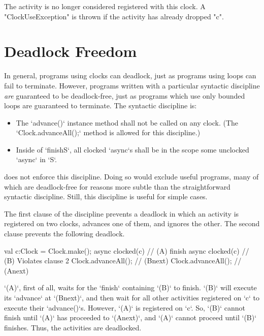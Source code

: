\noindent{} The activity is no longer considered registered with this
clock.  A \xcd"ClockUseException" is thrown if the activity has
already dropped \xcd"c".

\section{Deadlock Freedom}

In general, programs using clocks can deadlock, just as programs using loops
can fail to terminate.  However, programs written with a particular syntactic
discipline {\em are} guaranteed to be deadlock-free, just as programs which
use only bounded loops are guaranteed to terminate.  The syntactic discipline
is: 
\begin{itemize}
\item The \xcd`advance()` {instance method} shall not be called on any clock.
      (The 
      \xcd`Clock.advanceAll();` method is allowed for this discipline.)
\item Inside of \xcd`finish{S}`, all clocked \xcd`async`s shall be in the scope
      some unclocked \xcd`async` in \xcd`S`.
\end{itemize}
\Xten{} does not enforce this discipline.  Doing so would exclude useful programs,
many of which are deadlock-free for reasons more subtle than the
straightforward syntactic discipline.  Still, this discipline is useful for
simple cases. 

The first clause of the discipline prevents a deadlock in which an activity
is registered on two clocks, advances one of them, and ignores the other. 
The second clause prevents the following deadlock.  
\begin{xten}
val c:Clock = Clock.make();
async clocked(c) {                // (A) 
      finish async clocked(c) {   // (B) Violates clause 2
            Clock.advanceAll();   // (Bnext)
      }
      Clock.advanceAll();         // (Anext)
}
\end{xten}
\xcd`(A)`, first of all, waits for the \xcd`finish` containing \xcd`(B)` to
finish.  
\xcd`(B)` will execute its \xcd`advance` at \xcd`(Bnext)`, and then wait for all
other activities registered on \xcd`c` to execute their \xcd`advance()`s.
However, \xcd`(A)` is registered on \xcd`c`.  So, \xcd`(B)` cannot finish
until \xcd`(A)` has proceeded to \xcd`(Anext)`, and \xcd`(A)` cannot proceed
until \xcd`(B)` finishes. Thus, the activities are deadlocked.


